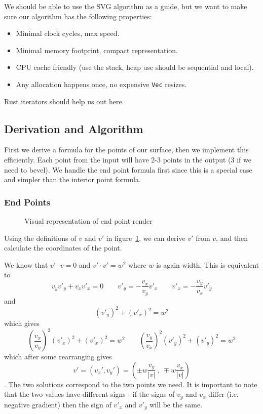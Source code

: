 \documentclass[]{article}
\begin{document}
We should be able to use the SVG algorithm as a guide, but we want to make sure our algorithm has the following properties:
\begin{itemize}
	\item Minimal clock cycles, max speed.
	\item Minimal memory footprint, compact representation.
	\item CPU cache friendly (use the stack, heap use should be sequential and local).
	\item Any allocation happens once, no expensive \texttt{Vec} resizes.
\end{itemize}
Rust iterators should help us out here.

\subsection{Derivation and Algorithm}
First we derive a formula for the points of our surface, then we implement this efficiently. Each point from the input will have 2-3 points in the output (3 if we need to bevel). We handle the end point formula first since this is a special case and simpler than the interior point formula.

\subsubsection{End Points}

\begin{figure}[!htbp]
	\centering
	\def\svgwidth{200pt}
	
	\caption{Visual representation of end point render}
	\label{fig:linegraph-exterior}
\end{figure}

Using the definitions of $v$ and $v'$ in figure~\ref{fig:linegraph-exterior}, we can derive $v'$ from $v$, and then calculate the coordinates of the point.

We know that $v' \cdot v = 0$ and $v' \cdot v' = w^2$ where $w$ is again width. This is equivalent to 
\begin{equation}
v_y v'_y + v_x v'_x = 0 \qquad v'_y = -\frac{v_x}{v_y} v'_x  \qquad v'_x = -\frac{v_y}{v_x} v'_y
\end{equation}
and 
\begin{equation}
(v'_y)^2 + (v'_x)^2 = w^2
\end{equation}
which gives 
\begin{equation*}
\left(\frac{v_x}{v_y}\right)^2 (v'_x)^2 + (v'_x)^2 = w^2 \qquad \left(\frac{v_y}{v_x}\right)^2 (v'_y)^2 + (v'_y)^2 = w^2
\end{equation*} 
which after some rearranging gives 
\begin{equation}
v' = (v_x', v_y') = \left( \pm w \frac{v_y}{|v|}\ ,\  \mp w \frac{v_x}{|v|}\right)
\end{equation}
. The two solutions correspond to the two points we need. It is important to note that the two values have different signs - if the signs of $v_y$ and $v_x$ differ (i.e. negative gradient) then the sign of $v'_x$ and $v'_y$ will be the same.
\end{document}
